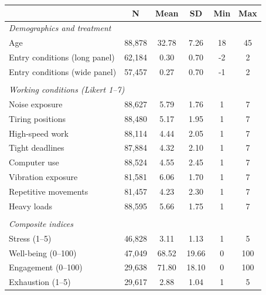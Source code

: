 \begin{tabular}{lccccc}
\toprule
  & N & Mean & SD & Min & Max \\
\midrule
\multicolumn{6}{l}{\textit{Demographics and treatment}} \\
\quad Age & 88,878 & 32.78 & 7.26 & 18 & 45 \\
\quad Entry conditions (long panel) & 62,184 & 0.30 & 0.70 & -2 & 2 \\
\quad Entry conditions (wide panel) & 57,457 & 0.27 & 0.70 & -1 & 2 \\
\\[0.5em]
\multicolumn{6}{l}{\textit{Working conditions (Likert 1--7)}} \\
\quad Noise exposure & 88,627 & 5.79 & 1.76 & 1 & 7 \\
\quad Tiring positions & 88,480 & 5.17 & 1.95 & 1 & 7 \\
\quad High-speed work & 88,114 & 4.44 & 2.05 & 1 & 7 \\
\quad Tight deadlines & 87,884 & 4.32 & 2.10 & 1 & 7 \\
\quad Computer use & 88,524 & 4.55 & 2.45 & 1 & 7 \\
\quad Vibration exposure & 81,581 & 6.06 & 1.70 & 1 & 7 \\
\quad Repetitive movements & 81,457 & 4.23 & 2.30 & 1 & 7 \\
\quad Heavy loads & 88,595 & 5.66 & 1.75 & 1 & 7 \\
\\[0.5em]
\multicolumn{6}{l}{\textit{Composite indices}} \\
\quad Stress (1--5) & 46,828 & 3.11 & 1.13 & 1 & 5 \\
\quad Well-being (0--100) & 47,049 & 68.52 & 19.66 & 0 & 100 \\
\quad Engagement (0--100) & 29,638 & 71.80 & 18.10 & 0 & 100 \\
\quad Exhaustion (1--5) & 29,617 & 2.88 & 1.04 & 1 & 5 \\
\bottomrule
\end{tabular}
